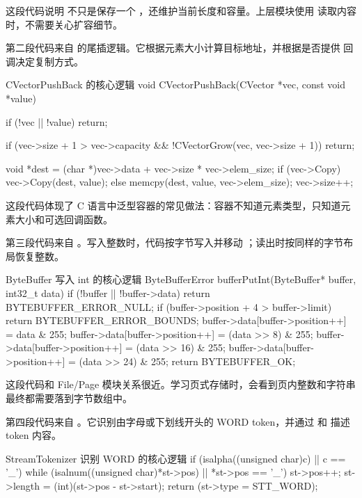 这段代码说明  不只是保存一个 ，还维护当前长度和容量。上层模块使用  读取内容时，不需要关心扩容细节。

第二段代码来自  的尾插逻辑。它根据元素大小计算目标地址，并根据是否提供  回调决定复制方式。

\begin{dbcode}{CVectorPushBack 的核心逻辑}
void CVectorPushBack(CVector *vec, const void *value) {
    if (!vec || !value) {
        return;
    }

    if (vec->size + 1 > vec->capacity && !CVectorGrow(vec, vec->size + 1)) {
        return;
    }

    void *dest = (char *)vec->data + vec->size * vec->elem_size;
    if (vec->Copy) {
        vec->Copy(dest, value);
    } else {
        memcpy(dest, value, vec->elem_size);
    }
    vec->size++;
}
\end{dbcode}

这段代码体现了 C 语言中泛型容器的常见做法：容器不知道元素类型，只知道元素大小和可选回调函数。

第三段代码来自 。写入整数时，代码按字节写入并移动 ；读出时按同样的字节布局恢复整数。

\begin{dbcode}{ByteBuffer 写入 int 的核心逻辑}
ByteBufferError bufferPutInt(ByteBuffer* buffer, int32_t data){
    if (!buffer || !buffer->data) return BYTEBUFFER_ERROR_NULL;
    if (buffer->position + 4 > buffer->limit) return BYTEBUFFER_ERROR_BOUNDS;
    buffer->data[buffer->position++] = data & 255;
    buffer->data[buffer->position++] = (data >> 8) & 255;
    buffer->data[buffer->position++] = (data >> 16) & 255;
    buffer->data[buffer->position++] = (data >> 24) & 255;
    return BYTEBUFFER_OK;
}
\end{dbcode}

这段代码和 File/Page 模块关系很近。学习页式存储时，会看到页内整数和字符串最终都需要落到字节数组中。

第四段代码来自 。它识别由字母或下划线开头的 WORD token，并通过  和  描述 token 内容。

\begin{dbcode}{StreamTokenizer 识别 WORD 的核心逻辑}
if (isalpha((unsigned char)c) || c == '_') {
    while (isalnum((unsigned char)*st->pos) || *st->pos == '_') st->pos++;
    st->length = (int)(st->pos - st->start);
    return (st->type = STT_WORD);
}
\end{dbcode}

